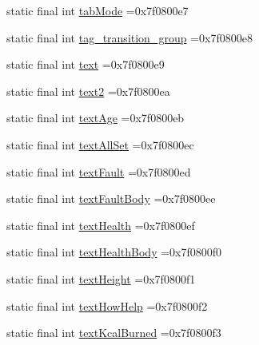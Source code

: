 \begin{DoxyCompactItemize}
\item 
static final int \mbox{\hyperlink{classcom_1_1example_1_1trainawearapplication_1_1_r_1_1id_a79eda6d8b96c389f35a0e942f07287a6}{tab\+Mode}} =0x7f0800e7
\item 
static final int \mbox{\hyperlink{classcom_1_1example_1_1trainawearapplication_1_1_r_1_1id_aee1bc5c781eaec5a8332808483e60c40}{tag\+\_\+transition\+\_\+group}} =0x7f0800e8
\item 
static final int \mbox{\hyperlink{classcom_1_1example_1_1trainawearapplication_1_1_r_1_1id_a0688a958d29c351795293e8a1a6c03e6}{text}} =0x7f0800e9
\item 
static final int \mbox{\hyperlink{classcom_1_1example_1_1trainawearapplication_1_1_r_1_1id_a9b5519b70fdbc0423eb613c33c3292b7}{text2}} =0x7f0800ea
\item 
static final int \mbox{\hyperlink{classcom_1_1example_1_1trainawearapplication_1_1_r_1_1id_ac0bd50fc338aadf7e06b5a0c2d9c1eb7}{text\+Age}} =0x7f0800eb
\item 
static final int \mbox{\hyperlink{classcom_1_1example_1_1trainawearapplication_1_1_r_1_1id_ae43e614e0dd9fb7bb9c3c12e95703f42}{text\+All\+Set}} =0x7f0800ec
\item 
static final int \mbox{\hyperlink{classcom_1_1example_1_1trainawearapplication_1_1_r_1_1id_ae9e26dd69717c6a5c37d4a5cc69f857d}{text\+Fault}} =0x7f0800ed
\item 
static final int \mbox{\hyperlink{classcom_1_1example_1_1trainawearapplication_1_1_r_1_1id_a8efcb79c50eec42c0ddec027f8ed0984}{text\+Fault\+Body}} =0x7f0800ee
\item 
static final int \mbox{\hyperlink{classcom_1_1example_1_1trainawearapplication_1_1_r_1_1id_adafc1383016acb2887c84ec312e2801b}{text\+Health}} =0x7f0800ef
\item 
static final int \mbox{\hyperlink{classcom_1_1example_1_1trainawearapplication_1_1_r_1_1id_a1542d824ad2e63abc7a538ea36e6d4fc}{text\+Health\+Body}} =0x7f0800f0
\item 
static final int \mbox{\hyperlink{classcom_1_1example_1_1trainawearapplication_1_1_r_1_1id_a3de920808c40e2f0cc9dd4eaa047da0f}{text\+Height}} =0x7f0800f1
\item 
static final int \mbox{\hyperlink{classcom_1_1example_1_1trainawearapplication_1_1_r_1_1id_a6ac881550baf841d00e3ae43ab0830ad}{text\+How\+Help}} =0x7f0800f2
\item 
static final int \mbox{\hyperlink{classcom_1_1example_1_1trainawearapplication_1_1_r_1_1id_a81fd086be49da1fca88ddd3cc682b8b8}{text\+Kcal\+Burned}} =0x7f0800f3

\end{DoxyCompactItemize}
